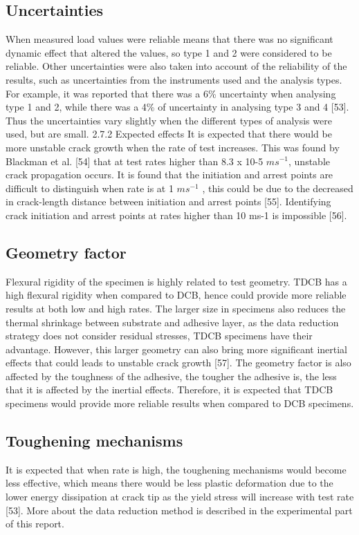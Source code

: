 \documentclass[numbers=noendperiod,chapterprefix=on]{icldt} %
\begin{document}
\subsection{Uncertainties}
When measured load values were reliable means that there was no significant dynamic effect that altered the values, so type 1 and 2 were considered to be reliable.
Other uncertainties were also taken into account of the reliability of the results, such as uncertainties from the instruments used and the analysis types. For example, it was reported that there was a 6\% uncertainty when analysing type 1 and 2, while there was a 4\% of uncertainty in analysing type 3 and 4 [53]. Thus the uncertainties vary slightly when the different types of analysis were used, but are small.
2.7.2 Expected effects
It is expected that there would be more unstable crack growth when the rate of test increases. This was found by Blackman et al. [54] that at test rates higher than 8.3 x 10-5 $ms^{-1}$, unstable crack propagation occurs.
It is found that the initiation and arrest points are difficult to distinguish when rate is at 1 $ms^{-1}$ , this could be due to the decreased in crack-length distance between initiation and arrest points [55]. Identifying crack initiation and arrest points at rates higher than 10 ms-1 is impossible [56].

\subsection{Geometry factor}
Flexural rigidity of the specimen is highly related to test geometry. TDCB has a high flexural rigidity when compared to DCB, hence could provide more reliable results at both low and high rates. The larger size in specimens also reduces the thermal shrinkage between substrate and adhesive layer, as the data reduction strategy does not consider residual stresses, TDCB specimens have their advantage. However, this larger geometry can also bring more significant inertial effects that could leads to unstable crack growth [57]. The geometry factor is also affected by the toughness of the adhesive, the tougher the adhesive is, the less that it is affected by the inertial effects. Therefore, it is expected that TDCB specimens would provide more reliable results when compared to DCB specimens.

\subsection{Toughening mechanisms}
It is expected that when rate is high, the toughening mechanisms would become less effective, which means there would be less plastic deformation due to the lower energy dissipation at crack tip as the yield stress will increase with test rate [53].
More about the data reduction method is described in the experimental part of this report.
\end{document}
